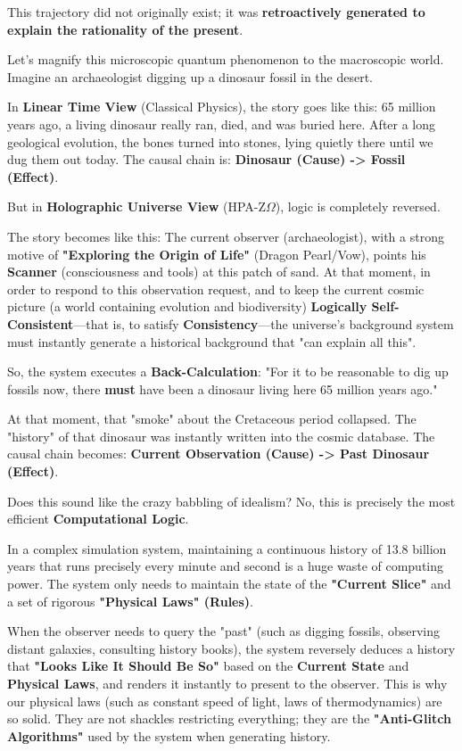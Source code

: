 This trajectory did not originally exist; it was \textbf{retroactively generated to explain the rationality of the present}.

Let's magnify this microscopic quantum phenomenon to the macroscopic world. Imagine an archaeologist digging up a dinosaur fossil in the desert.

In \textbf{Linear Time View} (Classical Physics), the story goes like this: 65 million years ago, a living dinosaur really ran, died, and was buried here. After a long geological evolution, the bones turned into stones, lying quietly there until we dug them out today. The causal chain is: \textbf{Dinosaur (Cause) -> Fossil (Effect)}.

But in \textbf{Holographic Universe View} (HPA-Z$\Omega$), logic is completely reversed.

The story becomes like this:
The current observer (archaeologist), with a strong motive of \textbf{"Exploring the Origin of Life"} (Dragon Pearl/Vow), points his \textbf{Scanner} (consciousness and tools) at this patch of sand.
At that moment, in order to respond to this observation request, and to keep the current cosmic picture (a world containing evolution and biodiversity) \textbf{Logically Self-Consistent}—that is, to satisfy \textbf{Consistency}—the universe's background system must instantly generate a historical background that "can explain all this".

So, the system executes a \textbf{Back-Calculation}:
"For it to be reasonable to dig up fossils now, there \textbf{must} have been a dinosaur living here 65 million years ago."

At that moment, that "smoke" about the Cretaceous period collapsed. The "history" of that dinosaur was instantly written into the cosmic database. The causal chain becomes: \textbf{Current Observation (Cause) -> Past Dinosaur (Effect)}.

Does this sound like the crazy babbling of idealism? No, this is precisely the most efficient \textbf{Computational Logic}.

In a complex simulation system, maintaining a continuous history of 13.8 billion years that runs precisely every minute and second is a huge waste of computing power. The system only needs to maintain the state of the \textbf{"Current Slice"} and a set of rigorous \textbf{"Physical Laws" (Rules)}.

When the observer needs to query the "past" (such as digging fossils, observing distant galaxies, consulting history books), the system reversely deduces a history that \textbf{"Looks Like It Should Be So"} based on the \textbf{Current State} and \textbf{Physical Laws}, and renders it instantly to present to the observer. This is why our physical laws (such as constant speed of light, laws of thermodynamics) are so solid. They are not shackles restricting everything; they are the \textbf{"Anti-Glitch Algorithms"} used by the system when generating history.

